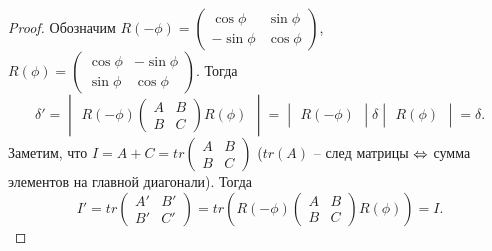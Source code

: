 \begin{proof}
        Обозначим $R(-\phi) = \begin{pmatrix}
            \cos\phi & \sin\phi \\
            -\sin\phi & \cos\phi
        \end{pmatrix}$, $R(\phi) = \begin{pmatrix}
                \cos\phi & -\sin\phi \\
                \sin\phi & \cos\phi
            \end{pmatrix}$. Тогда
        \[\delta' = \begin{vmatrix}
            R(-\phi) \begin{pmatrix}
                A & B \\
                B & C
            \end{pmatrix} R(\phi)
        \end{vmatrix} = \begin{vmatrix}
            R(-\phi)
        \end{vmatrix} \delta \begin{vmatrix}
            R(\phi)
        \end{vmatrix} = \delta.\]
        Заметим, что $I = A + C = tr\begin{pmatrix}
            A & B \\
            B & C
        \end{pmatrix}$ ($tr(A)$ -- след матрицы $\Leftrightarrow$ сумма элементов на главной диагонали). Тогда
        \[I' = tr\begin{pmatrix}
            A' & B' \\
            B' & C'
        \end{pmatrix} = tr\left(R(-\phi)\begin{pmatrix}
            A & B \\
            B & C
        \end{pmatrix} R(\phi)\right) = I.\]
    \end{proof}


